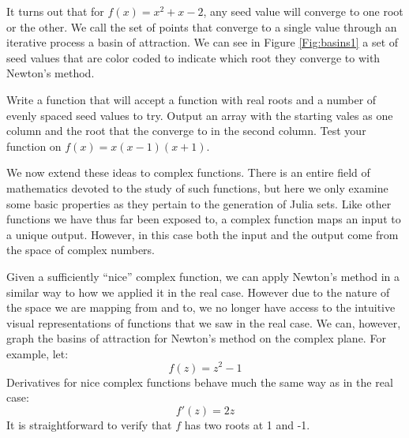 It turns out that for $f(x) = x^2 + x - 2$, any seed value will converge to one root or the other.  We call the set of points that converge to a single value through an iterative process a basin of attraction.  We can see in Figure \ref{Fig:basins1} a set of seed values that are color coded to indicate which root they converge to with Newton's method.

\begin{problem}
Write a function that will accept a function with real roots and a number of evenly spaced seed values to try. Output an array with the starting vales as one column and the root that the converge to in the second column. Test your function on $f(x) = x(x-1)(x+1)$.
\end{problem}


We now extend these ideas to complex functions.  There is an entire field of mathematics devoted to the study of such functions, but here we only examine some basic properties as they pertain to the generation of Julia sets.  Like other functions we have thus far been exposed to, a complex function maps an input to a unique output.  However, in this case both the input and the output come from the space of complex numbers.%

Given a sufficiently ``nice'' complex function, we can apply Newton's method in a similar way to how we applied it in the real case.  However due to the nature of the space we are mapping from and to, we no longer have access to the intuitive visual representations of functions that we saw in the real case.  We can, however, graph the basins of attraction for Newton's method on the complex plane.  For example, let:
\[
f(z) = z^2 - 1
\]
Derivatives for nice complex functions behave much the same way as in the real case:
\[
f'(z) = 2z
\]
It is straightforward to verify that $f$ has two roots at 1 and -1.

